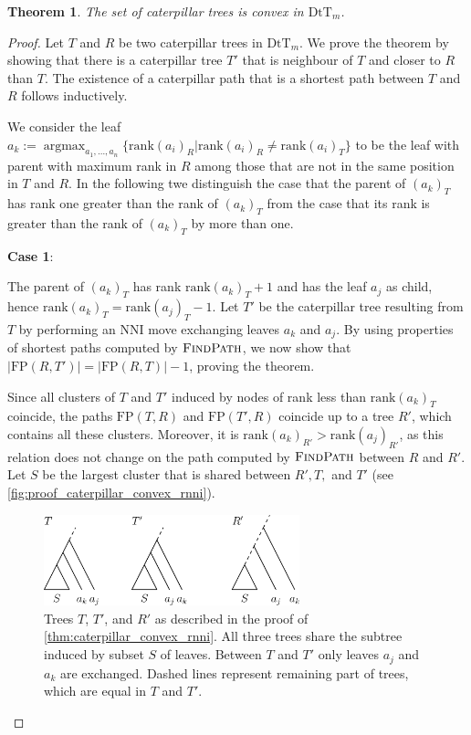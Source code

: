 \documentclass[11pt]{amsart}
\newtheorem{theorem}{Theorem}
\newcommand{\findpath}{\textsc{FindPath}}
\newcommand{\rank}{\mathrm{rank}}
\newcommand{\nni}{\mathrm{NNI}}
\newcommand{\fp}{\mathrm{FP}}
\newcommand{\dtt}{\mathrm{DtT}}
\DeclareMathOperator*{\argmax}{argmax}
\begin{document}
\begin{theorem}
	The set of caterpillar trees is convex in $\dtt_m$.
	\label{thm:caterpillar_convex_rnni}
\end{theorem}

\begin{proof}
	Let $T$ and $R$ be two caterpillar trees in $\dtt_m$.
	We prove the theorem by showing that there is a caterpillar tree $T'$ that is neighbour of $T$ and closer to $R$ than $T$.
	The existence of a caterpillar path that is a shortest path between $T$ and $R$ follows inductively.

	We consider the leaf $a_k := \argmax_{a_1, \ldots, a_n}\{\rank(a_i)_R | \rank(a_i)_R \neq \rank(a_i)_T\}$ to be the leaf with parent with maximum rank in $R$ among those that are not in the same position in $T$ and $R$.
	In the following twe distinguish the case that the parent of $(a_k)_T$ has rank one greater than the rank of $(a_k)_T$ from the case that its rank is greater than the rank of $(a_k)_T$ by more than one.

	\textbf{Case 1}:

	The parent of $(a_k)_T$ has rank $\rank(a_k)_T + 1$ and has the leaf $a_j$ as child, hence $\rank(a_k)_T = \rank(a_j)_T - 1$.
	Let $T'$ be the caterpillar tree resulting from $T$ by performing an $\nni$ move exchanging leaves $a_k$ and $a_j$.
	By using properties of shortest paths computed by $\findpath$, we now show that $|\fp(R,T')| = |\fp(R,T)| - 1$, proving the theorem.

	Since all clusters of $T$ and $T'$ induced by nodes of rank less than $\rank(a_k)_T$ coincide, the paths $\fp(T,R)$ and $\fp(T',R)$ coincide up to a tree $R'$, which contains all these clusters.
	Moreover, it is $\rank(a_k)_{R'}  > \rank(a_j)_{R'}$, as this relation does not change on the path computed by $\findpath$ between $R$ and $R'$.
	Let $S$ be the largest cluster that is shared between $R', T,$ and $T'$ (see \autoref{fig:proof_caterpillar_convex_rnni}).

	\begin{figure}[ht]
		\includegraphics[width=0.66\textwidth]{proof_caterpillar_convex_rnni.eps}
		\caption{Trees $T$, $T'$, and $R'$ as described in the proof of \autoref{thm:caterpillar_convex_rnni}.
		All three trees share the subtree induced by subset $S$ of leaves.
		Between $T$ and $T'$ only leaves $a_j$ and $a_k$ are exchanged.
		Dashed lines represent remaining part of trees, which are equal in $T$ and $T'$.}
		\label{fig:proof_caterpillar_convex_rnni}
	\end{figure}


\end{proof}
\end{document}

